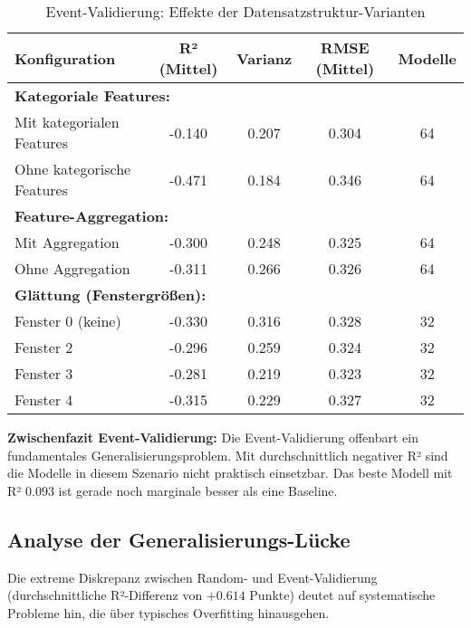 \begin{table}[H]
  \centering
  \begin{tabular}{lcccc}
    \toprule
    \textbf{Konfiguration} & \textbf{R² (Mittel)} & \textbf{Varianz} & \textbf{RMSE (Mittel)} & \textbf{Modelle} \\
    \midrule
    \multicolumn{5}{l}{\textbf{Kategoriale Features:}} \\
    Mit kategorialen Features & -0.140 & 0.207 & 0.304 & 64 \\
    Ohne kategorische Features & -0.471 & 0.184 & 0.346 & 64 \\
    \midrule
    \multicolumn{5}{l}{\textbf{Feature-Aggregation:}} \\
    Mit Aggregation & -0.300 & 0.248 & 0.325 & 64 \\
    Ohne Aggregation & -0.311 & 0.266 & 0.326 & 64 \\
    \midrule
    \multicolumn{5}{l}{\textbf{Glättung (Fenstergrößen):}} \\
    Fenster 0 (keine) & -0.330 & 0.316 & 0.328 & 32 \\
    Fenster 2 & -0.296 & 0.259 & 0.324 & 32 \\
    Fenster 3 & -0.281 & 0.219 & 0.323 & 32 \\
    Fenster 4 & -0.315 & 0.229 & 0.327 & 32 \\
    \bottomrule
  \end{tabular}
  \caption{Event-Validierung: Effekte der Datensatzstruktur-Varianten}
  \label{tab:structure_event}
\end{table}

\textbf{Zwischenfazit Event-Validierung:} Die Event-Validierung offenbart ein fundamentales Generalisierungsproblem. Mit durchschnittlich negativer R² sind die Modelle in diesem Szenario nicht praktisch einsetzbar. Das beste Modell mit R² $0.093$ ist gerade noch marginale besser als eine Baseline.



\subsection{Analyse der Generalisierungs-Lücke}

Die extreme Diskrepanz zwischen Random- und Event-Validierung (durchschnittliche R²-Differenz von $+0.614$ Punkte) deutet auf systematische Probleme hin, die über typisches Overfitting hinausgehen.
 

